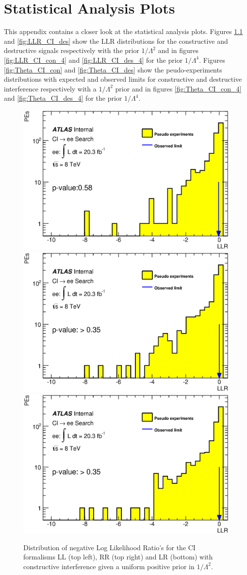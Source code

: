 \chapter{Statistical Analysis Plots}
	\label{ap:stat}


	This appendix contains a closer look at the statistical analysis plots. Figures \ref{fig:LLR_CI_con} and \ref{fig:LLR_CI_des} show the LLR distributions for the constructive and destructive signals respectively with the prior $1/\Lambda^{2}$ and in figures \ref{fig:LLR_CI_con_4} and \ref{fig:LLR_CI_des_4} for the prior $1/\Lambda^{4}$. Figures \ref{fig:Theta_CI_con} and \ref{fig:Theta_CI_des} show the peudo-experiments distributions with expected and observed limits for constructive and destructive interference respectively with a $1/\Lambda^{2}$ prior and in figures \ref{fig:Theta_CI_con_4} and \ref{fig:Theta_CI_des_4} for the prior $1/\Lambda^{4}$. 




    \begin{figure}[h]
        \begin{center}
            \includegraphics[width=0.42\linewidth]{images/ee__LL_minus_L2/LLR.eps}
            \includegraphics[width=0.42\linewidth]{images/ee__RR_minus_L2/LLR.eps}
            \includegraphics[width=0.42\linewidth]{images/ee__LR_minus_L2/LLR.eps}
        \end{center}
       \caption{Distribution of negative Log Likelihood Ratio's for the CI formalisms LL (top left), RR (top right) and LR (bottom) with constructive interference given a uniform positive prior in $1/\Lambda^{2}$.}
       \label{fig:LLR_CI_con}
    \end{figure}



